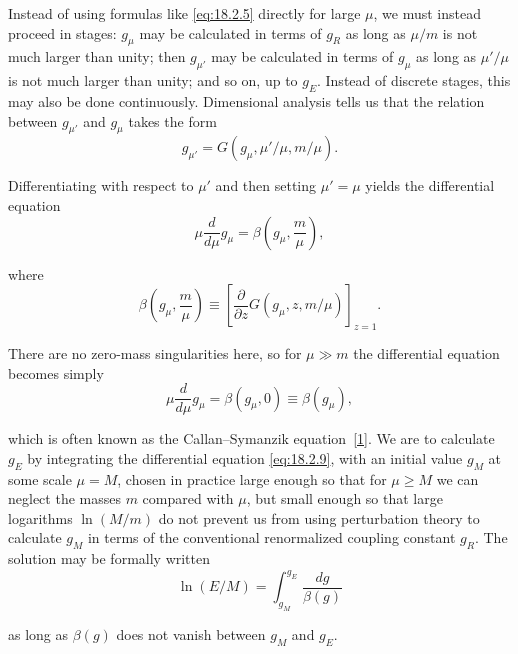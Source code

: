 Instead of using formulas like \eqref{eq:18.2.5} directly for large $\mu$, we
must instead proceed in stages: $g_\mu$ may be calculated in terms of $g_R$
as long as $\mu/m$ is not much larger than unity; then $g_{\mu'}$ may be
calculated in terms of $g_\mu$ as long as $\mu'/\mu$ is not much larger than
unity; and so on, up to $g_E$. Instead of discrete stages, this may also be
done continuously. Dimensional analysis tells us that the relation between
$g_{\mu'}$ and $g_\mu$ takes the form
\begin{equation}
g_{\mu'}=G(g_\mu,\mu'/\mu,m/\mu).
\tag{18.2.6}\label{eq:18.2.6}
\end{equation}
\par\noindent
Differentiating with respect to $\mu'$ and then setting $\mu'=\mu$ yields the
differential equation
\begin{equation}
\mu\frac{d}{d\mu}g_\mu=\beta\left(g_\mu,\frac{m}{\mu}\right),
\tag{18.2.7}\label{eq:18.2.7}
\end{equation}
\par\noindent
where
\begin{equation}
\beta\left(g_\mu,\frac{m}{\mu}\right)
\equiv\left[\frac{\partial}{\partial z}G(g_\mu,z,m/\mu)\right]_{z=1}.
\tag{18.2.8}\label{eq:18.2.8}
\end{equation}
\par\noindent
There are no zero-mass singularities here, so for $\mu\gg m$ the differential
equation becomes simply
\begin{equation}
\mu\frac{d}{d\mu}g_\mu=\beta(g_\mu,0)\equiv\beta(g_\mu),
\tag{18.2.9}\label{eq:18.2.9}
\end{equation}
\par\noindent
which is often known as the Callan--Symanzik equation~\hyperref[ch18-ref-1]{[1]}.
We are to calculate $g_E$ by integrating the differential equation
\eqref{eq:18.2.9}, with an initial value $g_M$ at some scale $\mu=M$, chosen
in practice large enough so that for $\mu\geq M$ we can neglect the masses
$m$ compared with $\mu$, but small enough so that large logarithms
$\ln(M/m)$ do not prevent us from using perturbation theory to calculate
$g_M$ in terms of the conventional renormalized coupling constant $g_R$. The
solution may be formally written
\begin{equation}
\ln(E/M)=\int_{g_M}^{g_E}\frac{dg}{\beta(g)}
\tag{18.2.10}\label{eq:18.2.10}
\end{equation}
\par\noindent
as long as $\beta(g)$ does not vanish between $g_M$ and $g_E$.

